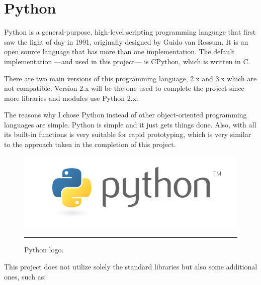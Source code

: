\section{Python}
\label{sec:whatispython}

Python is a general-purpose, high-level scripting programming language that first saw the light of day in 1991, originally designed by Guido van Rossum. It is an open source language that has more than one implementation. The default implementation ---and used in this project--- is CPython, which is written in C. 

There are two main versions of this programming language, 2.x and 3.x which are not compatible. Version 2.x will be the one used to complete the project since more libraries and modules use Python 2.x.

The reasons why I chose Python instead of other object-oriented programming languages are simple. Python is simple and it just gets things done. Also, with all its built-in functions is very suitable for rapid prototyping, which is very similar to the approach taken in the completion of this project.

\begin{figure}[htbp]
    \centering
    \includegraphics[scale=0.4]{./Figures/python-logo.png}
        \rule{35em}{0.5pt}
        \caption[Python logo]{Python logo.}
    \label{fig:pythonlogo}
\end{figure}

This project does not utilize solely the standard libraries but also some additional ones, such as:

